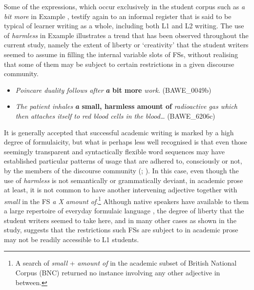 Some of the expressions, which occur exclusively in the student corpus such as \textit{a bit more} in Example , testify again to an informal register that is said to be typical of learner writing as a whole, including both L1 and L2 writing. The use of \textit{harmless} in Example  illustrates a trend that has been observed throughout the current study, namely the extent of liberty or ‘creativity’ that the student writers seemed to assume in filling the internal variable slots of FSs, without realising that some of them may be subject to certain restrictions in a given discourse community. 

\begin{itemize}
\item \begin{styleListParagraph}
\textit{Poincare duality follows after} \textbf{\textit{a} \textbf{bit} \textbf{more}} \textit{work}. (BAWE\_0049b)
\end{styleListParagraph}
\end{itemize}

\begin{itemize}
\item \begin{styleListParagraph}
\textit{The patient inhales} \textbf{\textit{a} \textbf{small,} \textbf{harmless} \textbf{amount} \textbf{of}} \textit{radioactive gas which then attaches itself to red blood cells in the blood…} (BAWE\_6206c) 
\end{styleListParagraph}
\end{itemize}

It is generally accepted that successful academic writing is marked by a high degree of formulaicity, but what is perhaps less well recognised is that even those seemingly transparent and syntactically flexible word sequences may have established particular patterns of usage that are adhered to, consciously or not, by the members of the discourse community (\citealt{Pérez-Llantada2014}; \citealt{Wang2018}). In this case, even though the use of \textit{harmless} is not semantically or grammatically deviant, in academic prose at least, it is not common to have another intervening adjective together with \textit{small} in the FS \textit{a X amount of}.\footnote{\textrm{A search of} \textrm{\textit{small} }\textrm{+} \textrm{\textit{amount of} }\textrm{in the academic subset of British National Corpus (BNC) returned no instance involving any other adjective in between.}} Although native speakers have available to them a large repertoire of everyday formulaic language \citep{Sinclair1991}, the degree of liberty that the student writers seemed to take here, and in many other cases as shown in the study, suggests that the restrictions such FSs are subject to in academic prose may not be readily accessible to L1 students.

